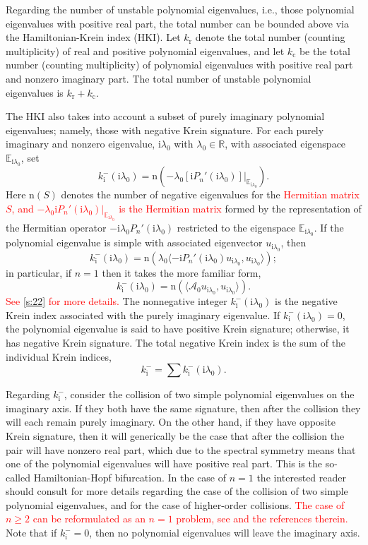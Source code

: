 \documentclass[review,onefignum,onetabnum]{siamart171218}
\newcommand{\E}{\mathbb{E}}
\newcommand{\R}{\mathbb{R}}
\newcommand{\rmc}{\mathrm{c}}
\newcommand{\rmi}{\mathrm{i}}
\newcommand{\rmn}{\mathrm{n}}
\newcommand{\rmr}{\mathrm{r}}
\newcommand{\calA}{\mathcal{A}}
\newcommand{\vS}{\bm{\mathit{S}}}
\newcommand{\revised}[1]{ \textcolor{red}{#1} }
\begin{document}
Regarding the number of unstable polynomial eigenvalues, i.e., those
polynomial eigenvalues with positive real part, the total number can be
bounded above via the Hamiltonian-Krein index (HKI). Let $k_\rmr$ denote the
total number (counting multiplicity) of real and positive polynomial
eigenvalues, and let $k_\rmc$ be the total number (counting multiplicity) of
polynomial eigenvalues with positive real part and nonzero imaginary part.
The total number of unstable polynomial eigenvalues is $k_\rmr+k_\rmc$.

The HKI also takes into account a subset of purely imaginary polynomial
eigenvalues; namely, those with negative Krein signature. For each purely
imaginary and nonzero eigenvalue, $\rmi\lambda_0$ with $\lambda_0\in\R$, with
associated eigenspace $\E_{\rmi\lambda_0}$, set
\[
k_\rmi^-(\rmi\lambda_0)=\rmn\left(-\lambda_0\left[\rmi P_n'(\rmi\lambda_0)\right]|_{\E_{\rmi\lambda_0}}\right).
\]
Here $\rmn(\vS)$ denotes the number of negative eigenvalues for the
\revised{
Hermitian matrix $\vS$, and $-\lambda_0\rmi P_n'(\rmi\lambda_0)|_{\E_{\rmi\lambda_0}}$ is the Hermitian matrix
}
formed by the representation of the Hermitian operator
$-\rmi\lambda_0P_n'(\rmi\lambda_0)$ restricted to the eigenspace
$\E_{\rmi\lambda_0}$. If the polynomial eigenvalue is simple with associated
eigenvector $u_{\rmi\lambda_0}$, then
\[
k_\rmi^-(\rmi\lambda_0)=
\rmn\left(\lambda_0\langle-\rmi P_n'(\rmi\lambda_0)u_{\rmi\lambda_0},u_{\rmi\lambda_0}\rangle\right);
\]
in particular, if $n=1$ then it takes the more familiar form,
\[
k_\rmi^-(\rmi\lambda_0)=
\rmn\left(\langle\calA_0u_{\rmi\lambda_0},u_{\rmi\lambda_0}\rangle\right).
\]
\revised{
See \cref{s:22} for more details.
}
The nonnegative integer $k_\rmi^-(\rmi\lambda_0)$ is the negative Krein index
associated with the purely imaginary eigenvalue. If
$k_\rmi^-(\rmi\lambda_0)=0$, the polynomial eigenvalue is said to have
positive Krein signature; otherwise, it has negative Krein signature. The
total negative Krein index is the sum of the individual Krein indices,
\[
k_\rmi^-=\sum k_\rmi^-(\rmi\lambda_0).
\]

Regarding $k_\rmi^-$, consider the
collision of two simple polynomial eigenvalues on the imaginary axis. If they both have the same
signature, then after the collision they will each remain purely imaginary.
On the other hand, if they have opposite Krein signature, then it will
generically be the case that after the collision the pair will have nonzero
real part, which due to the spectral symmetry means that one of the
polynomial eigenvalues will have positive real part. This is the so-called Hamiltonian-Hopf bifurcation. In the case of $n=1$ the interested reader
should consult \cite[Chapter~7.1]{kapitula:sad13} for more details regarding
the case of the collision of two simple polynomial  eigenvalues, and
\cite{kapitula:tks10,vougalter:eoz06} for the case of higher-order
collisions.
\revised{
The case of $n\ge2$ can be reformulated as an $n=1$ problem, see \cite{kapitula:iif13} and the references therein.
}
Note that if $k_\rmi^-=0$, then no polynomial eigenvalues will leave the imaginary axis.
\end{document}
